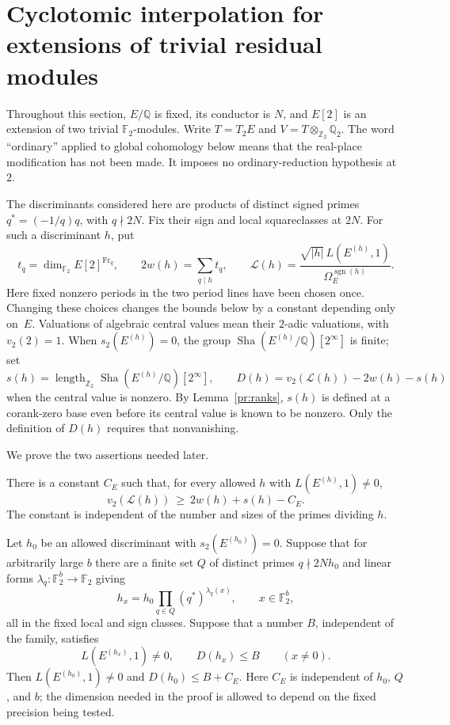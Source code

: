 \section{Cyclotomic interpolation for extensions of trivial residual modules}
\label{cy:section}

Throughout this section, $E/\mathbb Q$ is fixed, its conductor is $N$, and
$E[2]$ is an extension of two trivial $\mathbb F _2$-modules.  Write
$T=T_2E$ and $V=T\otimes_{\mathbb Z _2}\mathbb Q _2$.  The word
``ordinary'' applied to global cohomology below means that the real-place
modification has not been made.  It imposes no ordinary-reduction hypothesis
at~$2$.

The discriminants considered here are products of distinct signed primes
$q^*=(-1/q)q$, with $q\nmid 2N$.  Fix their sign and local squareclasses at
$2N$.  For such a discriminant $h$, put
\[
 t_q=\dim_{\mathbb F _2}E[2]^{\operatorname{Fr}_q},\qquad
 2w(h)=\sum_{q\mid h}t_q,\qquad
 \mathcal L(h)=\frac{\sqrt{|h|}\,L(E^{(h)},1)}{\Omega_E^{\operatorname{sgn}(h)}}.
\]
Here fixed nonzero periods in the two period lines have been chosen once.
Changing these choices changes the bounds below by a constant depending
only on~$E$.  Valuations of algebraic central values mean their $2$-adic
valuations, with $v_2(2)=1$.  When $s_2(E^{(h)})=0$, the group
$\operatorname{Sha}(E^{(h)}/\mathbb Q)[2^\infty]$ is finite; set
\[
 s(h)=\operatorname{length}_{\mathbb Z _2}
       \operatorname{Sha}(E^{(h)}/\mathbb Q)[2^\infty],\qquad
 D(h)=v_2(\mathcal L(h))-2w(h)-s(h)
\]
when the central value is nonzero.  By Lemma~\ref{pr:ranks}, $s(h)$ is
defined at a corank-zero base even before its central value is known to
be nonzero.  Only the definition of $D(h)$ requires that nonvanishing.

We prove the two assertions needed later.

\begin{theorem}\label{cy:lower-bound}
There is a constant $C_E$ such that, for every allowed $h$ with
$L(E^{(h)},1)\ne0$,
\[
 v_2(\mathcal L(h))\ \geq\ 2w(h)+s(h)-C_E.
\]
The constant is independent of the number and sizes of the primes dividing
$h$.
\end{theorem}

\begin{theorem}\label{cy:missing-vertex}
Let $h_0$ be an allowed discriminant with $s_2(E^{(h_0)})=0$.  Suppose that
for arbitrarily large $b$ there are a finite set $Q$ of distinct primes
$q\nmid 2Nh_0$ and linear forms
$\lambda_q:\mathbb F _2^b\longrightarrow\mathbb F _2$ giving
\[
 h_x=h_0\prod_{q\in Q}(q^*)^{\lambda_q(x)},\qquad x\in\mathbb F _2^b,
\]
all in the fixed local and sign classes.  Suppose that a number $B$,
independent of the family, satisfies
\[
 L(E^{(h_x)},1)\ne0,\qquad D(h_x)\leq B\qquad(x\ne0).
\]
Then $L(E^{(h_0)},1)\ne0$ and $D(h_0)\leq B+C_E$.
Here $C_E$ is independent of $h_0$, $Q$, and $b$; the dimension needed in
the proof is allowed to depend on the fixed precision being tested.
\end{theorem}

